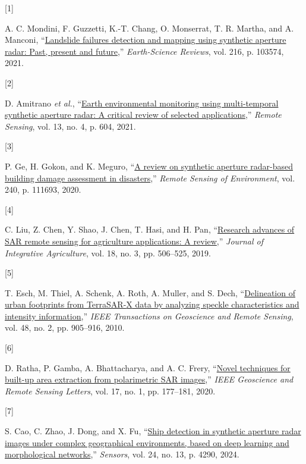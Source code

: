 \documentclass[
  lettersize  journal,
]{IEEEtran}%
\newlength{\cslhangindent}
\newlength{\csllabelwidth}
\newenvironment{CSLReferences}[2] %
 {\begin{list}{}{%
  \setlength{\itemindent}{0pt}
  \setlength{\leftmargin}{0pt}
  \setlength{\parsep}{0pt}
  \ifodd #1
   \setlength{\leftmargin}{\cslhangindent}
   \setlength{\itemindent}{-1\cslhangindent}
  \fi
  \setlength{\itemsep}{#2\baselineskip}}}
 {\end{list}}
\newcommand{\CSLLeftMargin}[1]{\parbox[t]{\csllabelwidth}{\strut#1\strut}}
\newcommand{\CSLRightInline}[1]{\parbox[t]{\linewidth - \csllabelwidth}{\strut#1\strut}}
\begin{document}
\label{refs}
\begin{CSLReferences}{0}{0}
\CSLLeftMargin{{[}1{]} }%
\CSLRightInline{A. C. Mondini, F. Guzzetti, K.-T. Chang, O. Monserrat,
T. R. Martha, and A. Manconi,
{``\href{https://doi.org/10.1016/j.earscirev.2021.103574}{Landslide
failures detection and mapping using synthetic aperture radar: Past,
present and future},''} \emph{Earth-Science Reviews}, vol. 216, p.
103574, 2021. }

\CSLLeftMargin{{[}2{]} }%
\CSLRightInline{D. Amitrano \emph{et al.},
{``\href{https://doi.org/10.3390/rs13040604}{Earth environmental
monitoring using multi-temporal synthetic aperture radar: A critical
review of selected applications},''} \emph{Remote Sensing}, vol. 13, no.
4, p. 604, 2021. }

\CSLLeftMargin{{[}3{]} }%
\CSLRightInline{P. Ge, H. Gokon, and K. Meguro,
{``\href{https://doi.org/10.1016/j.rse.2020.111693}{A review on
synthetic aperture radar-based building damage assessment in
disasters},''} \emph{Remote Sensing of Environment}, vol. 240, p.
111693, 2020. }

\CSLLeftMargin{{[}4{]} }%
\CSLRightInline{C. Liu, Z. Chen, Y. Shao, J. Chen, T. Hasi, and H. Pan,
{``\href{https://doi.org/10.1016/s2095-3119(18)62016-7}{Research
advances of SAR remote sensing for agriculture applications: A
review},''} \emph{Journal of Integrative Agriculture}, vol. 18, no. 3,
pp. 506--525, 2019. }

\CSLLeftMargin{{[}5{]} }%
\CSLRightInline{T. Esch, M. Thiel, A. Schenk, A. Roth, A. Muller, and S.
Dech, {``\href{https://doi.org/10.1109/tgrs.2009.2037144}{Delineation of
urban footprints from TerraSAR-{X} data by analyzing speckle
characteristics and intensity information},''} \emph{IEEE Transactions
on Geoscience and Remote Sensing}, vol. 48, no. 2, pp. 905--916, 2010. }

\CSLLeftMargin{{[}6{]} }%
\CSLRightInline{D. Ratha, P. Gamba, A. Bhattacharya, and A. C. Frery,
{``\href{https://doi.org/10.1109/LGRS.2019.2914913}{Novel techniques for
built-up area extraction from polarimetric {SAR} images},''} \emph{IEEE
Geoscience and Remote Sensing Letters}, vol. 17, no. 1, pp. 177--181,
2020. }

\CSLLeftMargin{{[}7{]} }%
\CSLRightInline{S. Cao, C. Zhao, J. Dong, and X. Fu,
{``\href{https://doi.org/10.3390/s24134290}{Ship detection in synthetic
aperture radar images under complex geographical environments, based on
deep learning and morphological networks},''} \emph{Sensors}, vol. 24,
no. 13, p. 4290, 2024. }


\end{CSLReferences}
\end{document}
